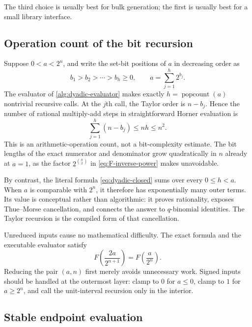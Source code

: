 \documentclass[11pt,oneside]{article}
\theoremstyle{definition}
\theoremstyle{remark}
\begin{document}
The third choice is usually best for bulk generation; the first is usually best for a small
library interface.

\subsection{Operation count of the bit recursion}

Suppose $0<a<2^n$, and write the set-bit positions of $a$ in decreasing order as
\begin{equation}
 b_1>b_2>\cdots>b_h\ge0,\qquad
 a=\sum_{j=1}^{h}2^{b_j}.                                 \label{eq:set-bit-positions}
\end{equation}
The evaluator of \cref{alg:dyadic-evaluator} makes exactly $h=\operatorname{popcount}(a)$
nontrivial recursive calls.  At the $j$th call, the Taylor order is $n-b_j$.  Hence the
number of rational multiply-add steps in straightforward Horner evaluation is
\begin{equation}
 \sum_{j=1}^{h}(n-b_j)
 \le nh
 \le n^2.                                                  \label{eq:bit-recursion-cost}
\end{equation}
This is an arithmetic-operation count, not a bit-complexity estimate.  The bit lengths of
the exact numerator and denominator grow quadratically in $n$ already at $a=1$, as the
factor $2^{\binom n2}$ in \eqref{eq:F-inverse-power} makes unavoidable.

By contrast, the literal formula \eqref{eq:dyadic-closed} sums over every
$0\le h<a$.  When $a$ is comparable with $2^n$, it therefore has exponentially many outer
terms.  Its value is conceptual rather than algorithmic: it proves rationality, exposes
Thue--Morse cancellation, and connects the answer to $q$-binomial identities.  The Taylor
recursion is the compiled form of that cancellation.

Unreduced inputs cause no mathematical difficulty.  The exact formula and the executable
evaluator satisfy
\begin{equation}
 F\left(\frac{2a}{2^{n+1}}\right)
 =F\left(\frac{a}{2^n}\right).                            \label{eq:dyadic-refinement-invariance}
\end{equation}
Reducing the pair $(a,n)$ first merely avoids unnecessary work.  Signed inputs should be
handled at the outermost layer: clamp to $0$ for $a\le0$, clamp to $1$ for
$a\ge2^n$, and call the unit-interval recursion only in the interior.

\subsection{Stable endpoint evaluation}
\end{document}
